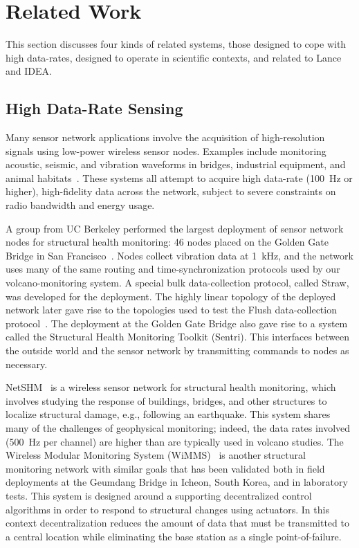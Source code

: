 \section{Related Work}
\label{sec-relatedwork}

This section discusses four kinds of related systems, those designed to cope
with high data-rates, designed to operate in scientific contexts, and related
to Lance and IDEA.

\subsection{High Data-Rate Sensing}

Many sensor network applications involve the acquisition of high-resolution
signals using low-power wireless sensor nodes. Examples include monitoring
acoustic, seismic, and vibration waveforms in bridges, industrial equipment,
and animal habitats~\cite{girod-ipsn07,enviromic}. These systems all attempt
to acquire high data-rate (100~Hz or higher), high-fidelity data across the
network, subject to severe constraints on radio bandwidth and energy usage.

A group from UC Berkeley performed the largest deployment of sensor network
nodes for structural health monitoring: 46 nodes placed on the Golden Gate
Bridge in San Francisco~\cite{ggb-ipsn07}. Nodes collect vibration data at
1~kHz, and the network uses many of the same routing and time-synchronization
protocols used by our volcano-monitoring system. A special bulk
data-collection protocol, called Straw, was developed for the deployment. The
highly linear topology of the deployed network later gave rise to the
topologies used to test the Flush data-collection
protocol~\cite{flush-sensys07}. The deployment at the Golden Gate Bridge also
gave rise to a system called the Structural Health Monitoring Toolkit
(Sentri). This interfaces between the outside world and the sensor network by
transmitting commands to nodes as necessary.

NetSHM~\cite{netshm-ewsnsubmission,netshm-emnets05,wisan} is a wireless
sensor network for structural health monitoring, which involves studying the
response of buildings, bridges, and other structures to localize structural
damage, e.g., following an earthquake. This system shares many of the
challenges of geophysical monitoring; indeed, the data rates involved (500~Hz
per channel) are higher than are typically used in volcano studies. The
Wireless Modular Monitoring System (WiMMS)~\cite{wimms-lynch06} is another
structural monitoring network with similar goals that has been validated both
in field deployments at the Geumdang Bridge in Icheon, South Korea, and in
laboratory tests. This system is designed around a supporting decentralized
control algorithms in order to respond to structural changes using actuators.
In this context decentralization reduces the amount of data that must be
transmitted to a central location while eliminating the base station as a
single point-of-failure.

